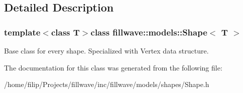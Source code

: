 \subsection{Detailed Description}
\subsubsection*{template$<$class T$>$class fillwave\+::models\+::\+Shape$<$ T $>$}

Base class for every shape. Specialized with Vertex data structure. 

The documentation for this class was generated from the following file\+:\begin{DoxyCompactItemize}
\item 
/home/filip/\+Projects/fillwave/inc/fillwave/models/shapes/Shape.\+h\end{DoxyCompactItemize}
